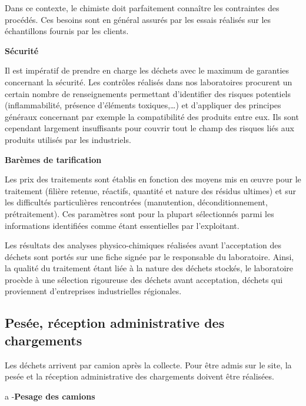 Dans ce contexte, le chimiste doit parfaitement connaître les contraintes des procédés.
Ces besoins sont en général assurés par les essais réalisés sur les échantillons fournis par les clients.

\vspace{0.3cm}
\textbf{Sécurité}
\vspace{0.3cm}

Il est impératif de prendre en charge les déchets avec le maximum de garanties concernant la sécurité. Les contrôles réalisés dans nos laboratoires procurent un certain nombre de renseignements permettant d’identifier des risques potentiels (inflammabilité, présence d’éléments toxiques,…) et d’appliquer des principes généraux concernant par exemple la compatibilité des produits entre eux. Ils sont cependant largement insuffisants pour couvrir tout le champ des risques liés aux produits utilisés par les industriels.

\vspace{0.3cm}
\textbf{Barèmes de tarification}
\vspace{0.3cm}

Les prix des traitements sont établis en fonction des moyens mis en œuvre pour le traitement (filière retenue, réactifs, quantité et nature des résidus ultimes) et sur les difficultés particulières rencontrées (manutention, déconditionnement, prétraitement). Ces paramètres sont pour la plupart sélectionnés parmi les informations identifiées comme étant essentielles par l’exploitant.
\vspace{0.3cm}

Les résultats des analyses physico-chimiques réalisées avant l’acceptation des déchets sont portés sur une fiche signée par le responsable du laboratoire.
Ainsi, la qualité du traitement étant liée à la nature des déchets stockés, le laboratoire procède à une sélection rigoureuse des déchets avant acceptation, déchets qui proviennent d’entreprises industrielles régionales.


\subsection{Pesée, réception administrative des chargements}

Les déchets arrivent par camion après la collecte. Pour être admis sur le site, la pesée et la réception administrative des chargements doivent être réalisées.

\vspace{0.3cm}
\newpage
	a -\textbf{Pesage des camions}
\vspace{0.3cm}

